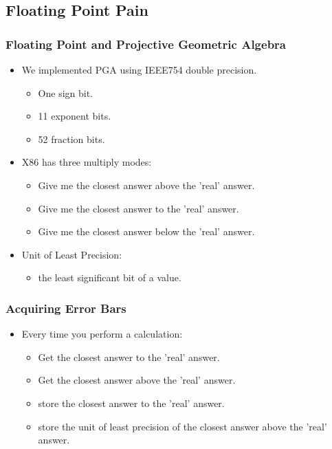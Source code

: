 \documentclass[hyperref={pdfpagemode=FullScreen},aspectratio=169]{beamer}
\begin{document}
\subsection{Floating Point Pain}
\begin{frame}
  \frametitle{Floating Point and Projective Geometric Algebra}
  \begin{itemize}
  \item We implemented PGA using IEEE754 double precision.
    \begin {itemize}
    \item One sign bit.
    \item 11 exponent bits.
    \item 52 fraction bits.
    \end{itemize}
  \item X86 has three multiply modes:
    \begin {itemize}
      \item Give me the closest answer above the 'real' answer.
      \item Give me the closest answer to the 'real' answer.
      \item Give me the closest answer below the 'real' answer.
    \end{itemize}
  \item Unit of Least Precision:
    \begin {itemize}
    \item the least significant bit of a value.
    \end{itemize}
  \end{itemize}
\end{frame}

\begin{frame}
  \frametitle{Acquiring Error Bars}
  \begin{itemize}
  \item Every time you perform a calculation:
    \begin {itemize}
      \item Get the closest answer to the 'real' answer.
      \item Get the closest answer above the 'real' answer.
      \item store the closest answer to the 'real' answer.
      \item store the unit of least precision of the closest answer above the 'real' answer.
    \end{itemize}
  \end{itemize}
\end{frame}
\end{document}
